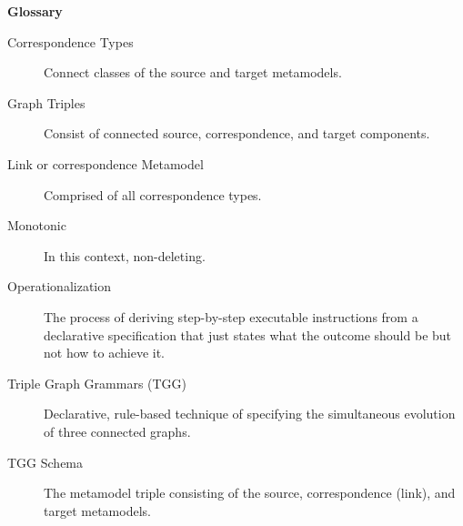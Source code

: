 \newpage
{}
{}
\hypertarget{glossary}{}

\vspace{1cm}
{\Huge \bf Glossary}
\vspace{1cm}

\begin{description}

\item[Correspondence Types] Connect classes of the source and target metamodels.

\item[Graph Triples] Consist of connected source, correspondence, and target components.

\item[Link or correspondence Metamodel] Comprised of all correspondence types.

\item[Monotonic] In this context, non-deleting.

\item[Operationalization] The process of deriving step-by-step executable instructions from a declarative specification that just states what the outcome should
be but not how to achieve it.

\item[Triple Graph Grammars (TGG)] Declarative, rule-based technique of specifying the simultaneous evolution of three connected graphs.

\item[TGG Schema] The metamodel triple consisting of the source, correspondence (link), and target metamodels.

\end{description}